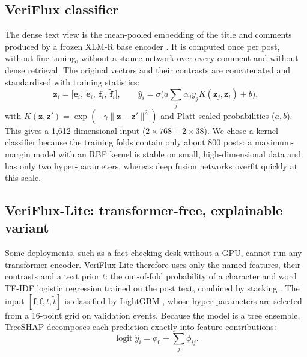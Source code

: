 \documentclass[conference]{IEEEtran}
\begin{document}
\subsection{VeriFlux classifier}
The dense text view is the mean-pooled embedding of the title and comments produced by a frozen XLM-R base
encoder \cite{conneau2020xlmr}. It is computed once per post, without fine-tuning, without a stance network over
every comment and without dense retrieval. The original vectors and their contrasts are concatenated and
standardised with training statistics:
\begin{equation}
\mathbf{z}_i=\big[\mathbf{e}_i,\ \tilde{\mathbf{e}}_i,\ \mathbf{f}_i,\ \tilde{\mathbf{f}}_i\big],\qquad
\hat{y}_i=\sigma\Big(a\sum_{j}\alpha_j y_j K(\mathbf{z}_j,\mathbf{z}_i)+b\Big),
\label{eq:z}
\end{equation}
with $K(\mathbf{z},\mathbf{z}')=\exp(-\gamma\lVert\mathbf{z}-\mathbf{z}'\rVert^2)$ and Platt-scaled
probabilities ($a,b$). This gives a 1,612-dimensional input ($2\times768+2\times38$). We chose a kernel
classifier because the training folds contain only about 800 posts: a maximum-margin model with an RBF kernel
is stable on small, high-dimensional data and has only two hyper-parameters, whereas deep fusion networks
overfit quickly at this scale.

\subsection{VeriFlux-Lite: transformer-free, explainable variant}
Some deployments, such as a fact-checking desk without a GPU, cannot run any transformer encoder. VeriFlux-Lite
therefore uses only the named features, their contrasts and a text prior $t$: the out-of-fold probability of a
character and word TF-IDF logistic regression trained on the post text, combined by stacking
\cite{wolpert1992stacking}. The input $[\mathbf{f},\tilde{\mathbf{f}},t,\tilde t]$ is classified by LightGBM
\cite{ke2017lightgbm}, whose hyper-parameters are selected from a 16-point grid on validation events. Because the
model is a tree ensemble, TreeSHAP \cite{lundberg2020treeshap,lundberg2017shap} decomposes each prediction
exactly into feature contributions:
\begin{equation}
\operatorname{logit}\hat{y}_i=\phi_0+\sum_{j}\phi_{ij}.
\label{eq:shap}
\end{equation}
\end{document}

